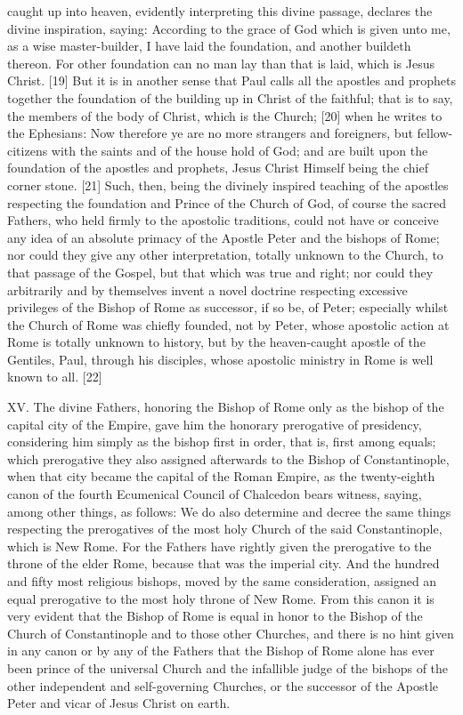 caught up into heaven, evidently interpreting this divine passage,
declares the divine inspiration, saying: \textquotesingle According to
the grace of God which is given unto me, as a wise master-builder, I
have laid the foundation, and another buildeth thereon. For other
foundation can no man lay than that is laid, which is Jesus
Christ.\textquotesingle{} {[}19{]} But it is in another sense that Paul
calls all the apostles and prophets together the foundation of the
building up in Christ of the faithful; that is to say, the members of
the body of Christ, which is the Church; {[}20{]} when he writes to the
Ephesians: \textquotesingle Now therefore ye are no more strangers and
foreigners, but fellow-citizens with the saints and of the house hold of
God; and are built upon the foundation of the apostles and prophets,
Jesus Christ Himself being the chief corner stone.\textquotesingle{}
{[}21{]} Such, then, being the divinely inspired teaching of the
apostles respecting the foundation and Prince of the Church of God, of
course the sacred Fathers, who held firmly to the apostolic traditions,
could not have or conceive any idea of an absolute primacy of the
Apostle Peter and the bishops of Rome; nor could they give any other
interpretation, totally unknown to the Church, to that passage of the
Gospel, but that which was true and right; nor could they arbitrarily
and by themselves invent a novel doctrine respecting excessive
privileges of the Bishop of Rome as successor, if so be, of Peter;
especially whilst the Church of Rome was chiefly founded, not by Peter,
whose apostolic action at Rome is totally unknown to history, but by the
heaven-caught apostle of the Gentiles, Paul, through his disciples,
whose apostolic ministry in Rome is well known to all. {[}22{]}

XV. The divine Fathers, honoring the Bishop of Rome only as the bishop
of the capital city of the Empire, gave him the honorary prerogative of
presidency, considering him simply as the bishop first in order, that
is, first among equals; which prerogative they also assigned afterwards
to the Bishop of Constantinople, when that city became the capital of
the Roman Empire, as the twenty-eighth canon of the fourth Ecumenical
Council of Chalcedon bears witness, saying, among other things, as
follows: \textquotesingle We do also determine and decree the same
things respecting the prerogatives of the most holy Church of the said
Constantinople, which is New Rome. For the Fathers have rightly given
the prerogative to the throne of the elder Rome, because that was the
imperial city. And the hundred and fifty most religious bishops, moved
by the same consideration, assigned an equal prerogative to the most
holy throne of New Rome.\textquotesingle{} From this canon it is very
evident that the Bishop of Rome is equal in honor to the Bishop of the
Church of Constantinople and to those other Churches, and there is no
hint given in any canon or by any of the Fathers that the Bishop of Rome
alone has ever been prince of the universal Church and the infallible
judge of the bishops of the other independent and self-governing
Churches, or the successor of the Apostle Peter and vicar of Jesus
Christ on earth.

